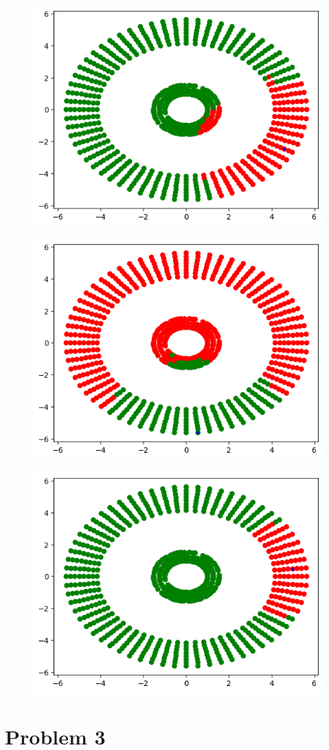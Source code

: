 \documentclass[a4paper,11pt]{article}
\begin{document}
\begin{mlsolution}
\begin{figure}[H]
	\label{fig:5.2.2.7}
\end{figure}
\begin{figure}[H]
	\centering
	\includegraphics[width=0.5\linewidth]{5.2.2.8.png}
	\label{fig:5.2.2.8}
\end{figure}
\begin{figure}[H]
	\centering
	\includegraphics[width=0.5\linewidth]{5.2.2.9.png}
	\label{fig:5.2.2.9}
\end{figure}
\begin{figure}[H]
	\centering
	\includegraphics[width=0.5\linewidth]{5.2.2.10.png}
	\label{fig:5.2.2.10}
\end{figure}

\newpage
\section{Problem 3}


\end{mlsolution}
\end{document}
